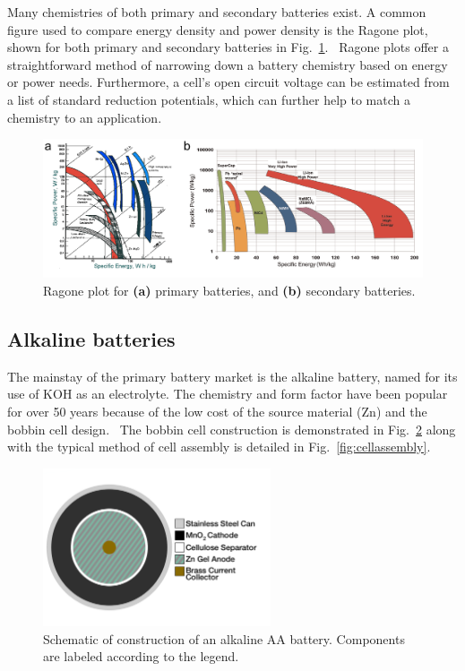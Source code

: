 Many chemistries of both primary and secondary batteries exist. A common figure used to compare energy density and power density is the Ragone plot, shown for both primary and secondary batteries in Fig.~\ref{fig:ragone}.~\cite{ragone_primary,ragone_secondary} Ragone plots offer a straightforward method of narrowing down a battery chemistry based on energy or power needs. Furthermore, a cell's open circuit voltage can be estimated from a list of standard reduction potentials, which can further help to match a chemistry to an application.

\begin{figure}[htb]
  \centering
    \includegraphics[width=\textwidth]{ch2-pastwork/images/ragone.png}
    \caption[Ragone plot of primary and secondary batteries.]{Ragone plot for \textbf{(a)} primary batteries, and \textbf{(b)} secondary batteries.}
    \label{fig:ragone}
\end{figure}

\subsection{Alkaline batteries}

The mainstay of the primary battery market is the alkaline battery, named for its use of KOH as an electrolyte. The chemistry and form factor have been popular for over 50 years because of the low cost of the source material (Zn) and the  bobbin cell design.~\cite{karl_patent} The bobbin cell construction is demonstrated in Fig.~\ref{fig:aaschem} along with the typical method of cell assembly is detailed in Fig.~\ref{fig:cellassembly}.~\cite{fujitsu} 

\begin{figure}[htb]
  \centering
    \includegraphics[width=0.60\textwidth]{ch3-dbb/Images/aaschem.png}
    \caption[Schematic of construction of an alkaline AA battery.]{Schematic of construction of an alkaline AA battery. Components are labeled according to the legend.}
    \label{fig:aaschem}
\end{figure}

